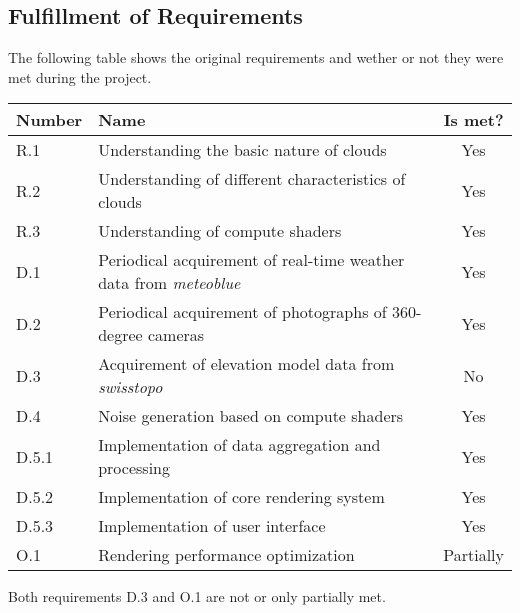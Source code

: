 \subsection{Fulfillment of Requirements}
\label{section:project:requirements}
The following table shows the original requirements and wether or not they were met during the project.
\emptyline
\begin{tabularx}{\textwidth}{|l|X|c|}
    \hline
    \textbf{Number} & \textbf{Name}                                                         & \textbf{Is met?} \\ \hline
    R.1             & Understanding the basic nature of clouds                              & Yes                 \\ \hline
    R.2             & Understanding of different characteristics of clouds                  & Yes                 \\ \hline
    R.3             & Understanding of compute shaders                                      & Yes                 \\ \hline
    D.1             & Periodical acquirement of real-time weather data from \emph{meteoblue}& Yes                 \\ \hline
    D.2             & Periodical acquirement of photographs of 360-degree cameras           & Yes                 \\ \hline
    D.3             & Acquirement of elevation model data from \emph{swisstopo}             & No                  \\ \hline
    D.4             & Noise generation based on compute shaders                             & Yes                 \\ \hline
    D.5.1           & Implementation of data aggregation and processing                     & Yes                 \\ \hline
    D.5.2           & Implementation of core rendering system                               & Yes                 \\ \hline
    D.5.3           & Implementation of user interface                                      & Yes                 \\ \hline
    O.1             & Rendering performance optimization                                    & Partially           \\ \hline
\end{tabularx}
\emptyline
Both requirements D.3 and O.1 are not or only partially met.

